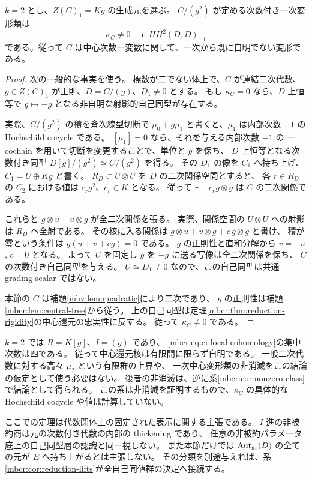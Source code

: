 \begin{corollary}[二ブロックの一次中心変形の非消滅]
\label{mbcr:cor:nonzero-class}
$k=2$ とし、$Z(C)_1=Kg$ の生成元を選ぶ。
$C/(g^2)$ が定める次数付き一次変形類は
\[
 \kappa_C\ne0\quad\text{in }HH^2(D,D)_{-1}
\]
である。従って $C$ は中心次数一変数に関して、一次から既に自明でない変形である。
\end{corollary}
\begin{proof}
次の一般的な事実を使う。
標数が二でない体上で、$C$ が連結二次代数、
$g\in Z(C)_1$ が正則、$D=C/(g)$、$D_1\ne0$ とする。
もし $\kappa_C=0$ なら、$D$ 上恒等で
$g\mapsto-g$ となる非自明な射影的自己同型が存在する。

実際、$C/(g^2)$ の積を斉次線型切断で
$\mu_0+g\mu_1$ と書くと、$\mu_1$ は内部次数 $-1$ の
Hochschild cocycle である。
$[\mu_1]=0$ なら、それを与える内部次数 $-1$ の
一 cochain を用いて切断を変更することで、単位と $g$ を保ち、
$D$ 上恒等となる次数付き同型
$D[g]/(g^2)\simeq C/(g^2)$ を得る。
その $D_1$ の像を $C_1$ へ持ち上げ、$C_1=U\oplus Kg$ と書く。
$R_D\subset U\otimes U$ を $D$ の二次関係空間とすると、
各 $r\in R_D$ の $C_2$ における値は $c_rg^2$、$c_r\in K$ となる。
従って $r-c_rg\otimes g$ は $C$ の二次関係である。

これらと $g\otimes u-u\otimes g$ が全二次関係を張る。
実際、関係空間の $U\otimes U$ への射影は $R_D$ へ全射である。
その核に入る関係は
$g\otimes u+v\otimes g+c\,g\otimes g$ と書け、
積が零という条件は $g(u+v+cg)=0$ である。
$g$ の正則性と直和分解から $v=-u$, $c=0$ となる。
よって $U$ を固定し $g$ を $-g$ に送る写像は全二次関係を保ち、
$C$ の次数付き自己同型を与える。
$U\simeq D_1\ne0$ なので、この自己同型は共通 grading scalar ではない。

本節の $C$ は補題\ref{mbv:lem:quadratic}により二次であり、
$g$ の正則性は補題\ref{mbcr:lem:central-free}から従う。
上の自己同型は定理\ref{mbcr:thm:reduction-rigidity}の中心還元の忠実性に反する。
従って $\kappa_C\ne0$ である。
\end{proof}

\begin{remark}[二ブロックと主張の範囲]
$k=2$ では $R=K[g]$、$I=(g)$ であり、
\eqref{mbcr:eq:ci-local-cohomology}の集中次数は四である。
従って中心還元核は有限開に限らず自明である。
一般二次代数に対する高々 $\mu_2$ という有限群の上界や、
一次中心変形類の非消滅をこの結論の仮定として使う必要はない。
後者の非消滅は、逆に系\ref{mbcr:cor:nonzero-class}で結論として得られる。
この系は非消滅を証明するもので、$\kappa_C$ の具体的な Hochschild cocycle や値は計算していない。

ここでの定理は代数閉体上の固定された表示に関する主張である。
$I$-進の非被約商は元の次数付き代数の内部の thickening であり、
任意の非被約パラメータ底上の自己同型層の認識と同一視しない。
また本節だけでは $\operatorname{Aut}_{\mathrm{gr}}(D)$ の全ての元が $E$ へ持ち上がるとは主張しない。
その分類を別途与えれば、系\ref{mbcr:cor:reduction-lifts}が全自己同値群の決定へ接続する。
\end{remark}
